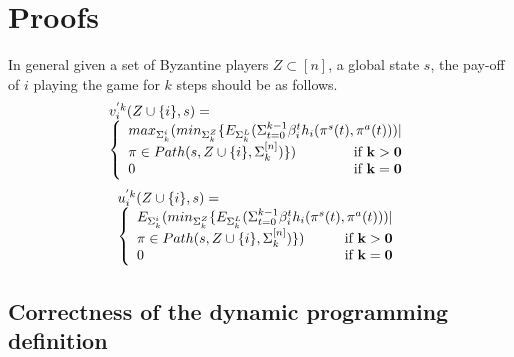 
\renewcommand{\thesection}{\Alph{section}}%

\section{Proofs}\label{apdx}

\setcounter{theorem}{0}
\setcounter{proposition}{0}
\setcounter{lemma}{0}

In general given a set of Byzantine players $Z \subset [n]$, a global state $s$, 
the pay-off of $i$ playing the game for $k$ steps should be as follows.
\[
\begin{array}{l}
v_i^{'k}(Z\cup\{i\},s)=\\
\left\{
\begin{array}{l}
max_{\Sigma^{i}_k}
(min_{\Sigma^{Z}_k}
\{E_{\Sigma^{L}_k}
(\Sigma_{t=0}^{k-1} \beta_i^{t}h_{i}(\pi^{s}(t),\pi^{a}(t))) |\\ \pi \in Path(s,Z\cup \{i\},\Sigma^{[n]}_k)\}) \hfill {\bf \text{if } k > 0}\\
0 \hfill {\bf \text{if } k = 0}
\end{array}
\right.
\end{array}
\]
\[
\begin{array}{l}
u_i^{'k}(Z\cup\{i\},s)=\\
\left\{
\begin{array}{l}
E_{\Sigma^{i}_k}
(min_{\Sigma^{Z}_k}
\{E_{\Sigma^{L}_k}
(\Sigma_{t=0}^{k-1} \beta_i^{t}h_{i}(\pi^{s}(t),\pi^{a}(t))) |\\ \pi \in Path(s,Z\cup \{i\},\Sigma^{[n]}_k)\})\hfill {\bf \text{if } k > 0} \\
0 \hfill {\bf \text{if } k = 0} 
\end{array}
\right.
\end{array}
\]

\subsection{Correctness of the dynamic programming definition}
%
%



